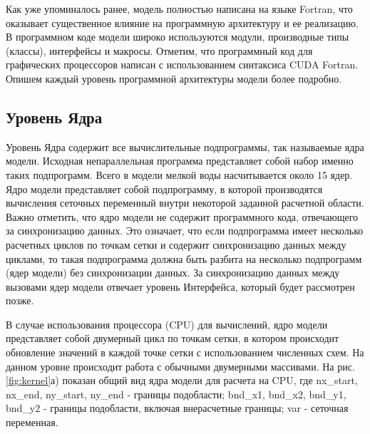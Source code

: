 Как уже упоминалось ранее, модель полностью написана на языке Fortran, что оказывает существенное влияние на программную архитектуру и ее реализацию.
В программном коде модели широко используются модули, производные типы (классы), интерфейсы и макросы.
Отметим, что программный код для графических процессоров написан с использованием синтаксиса CUDA Fortran. 
Опишем каждый уровень программной архитектуры модели более подробно.

\subsection{Уровень Ядра}

Уровень Ядра содержит все вычислительные подпрограммы, так называемые ядра модели. Исходная непараллельная программа представляет собой набор именно таких подпрограмм.
Всего в модели мелкой воды насчитывается около 15 ядер. Ядро модели представляет собой подпрограмму, в которой производятся вычисления сеточных переменный внутри некоторой заданной расчетной области. Важно отметить, что ядро модели не содержит программного кода, отвечающего за синхронизацию данных.
Это означает, что если подпрограмма имеет несколько расчетных циклов по точкам сетки и содержит синхронизацию данных между циклами, то такая подпрограмма должна быть разбита на несколько подпрограмм (ядер модели) без синхронизации данных.
За синхронизацию данных между вызовами ядер модели отвечает уровень Интерфейса, который будет рассмотрен позже.

В случае использования процессора (CPU) для вычислений, ядро модели представляет собой двумерный цикл по точкам сетки, в котором происходит обновление значений в каждой точке сетки с использованием численных схем.
На данном уровне происходит работа с обычными двумерными массивами.
На рис. \ref{fig:kernel}а) показан общий вид ядра модели для расчета на CPU, где nx\_start, nx\_end, ny\_start, ny\_end - границы подобласти; bnd\_x1, bnd\_x2, bnd\_y1, bnd\_y2 - границы подобласти, включая внерасчетные границы; var - сеточная переменная.

